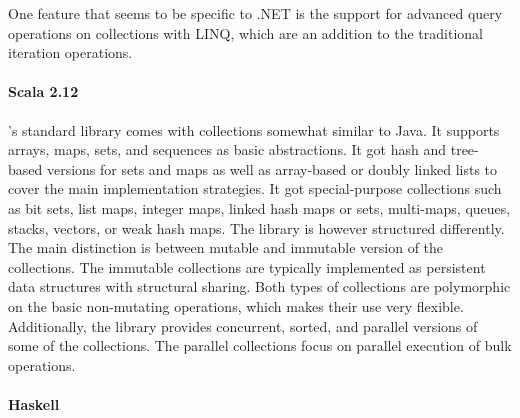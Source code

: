 \documentclass[sigconf, 10pt]{acmart}
\begin{document}
One feature that seems to be specific to .NET
is the support for advanced query operations on collections with LINQ,
which are an addition to the traditional iteration operations.

\paragraph{Scala 2.12}

's standard library
comes with collections somewhat similar to Java.
It supports arrays, maps, sets, and sequences as basic abstractions.
It got hash and tree-based versions for sets and maps
as well as array-based or doubly linked lists
to cover the main implementation strategies.
It got special-purpose collections
such as bit sets, list maps, integer maps, linked hash maps or sets, multi-maps,
queues, stacks, vectors, or weak hash maps.
The library is however structured differently.
The main distinction is between mutable and immutable version
of the collections.
The immutable collections are typically implemented
as persistent data structures with structural sharing.
Both types of collections are polymorphic on the basic non-mutating operations,
which makes their use very flexible.
Additionally, the library provides concurrent, sorted,
and parallel versions of some of the collections.
The parallel collections focus on parallel execution of bulk operations.

%

\paragraph{Haskell}
\end{document}

